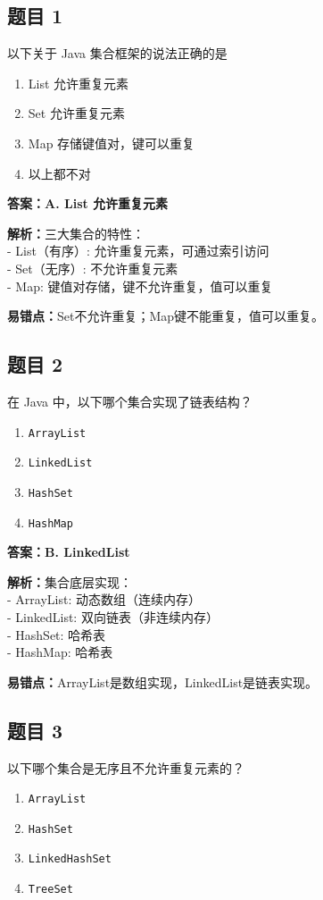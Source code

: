 \documentclass[12pt,a4paper]{ctexart}
\begin{document}
\subsection*{题目 1}
以下关于 Java 集合框架的说法正确的是
\begin{enumerate}[label=\Alph*.]
	\item List 允许重复元素
	\item Set 允许重复元素
	\item Map 存储键值对，键可以重复
	\item 以上都不对
\end{enumerate}

\begin{answerbox}
	\textbf{答案：A. List 允许重复元素}

	\textbf{解析：}三大集合的特性：\\
	- List（有序）: 允许重复元素，可通过索引访问\\
	- Set（无序）: 不允许重复元素\\
	- Map: 键值对存储，键不允许重复，值可以重复

	\textbf{易错点：}Set不允许重复；Map键不能重复，值可以重复。
\end{answerbox}

\subsection*{题目 2}
在 Java 中，以下哪个集合实现了链表结构？
\begin{enumerate}[label=\Alph*.]
	\item \texttt{ArrayList}
	\item \texttt{LinkedList}
	\item \texttt{HashSet}
	\item \texttt{HashMap}
\end{enumerate}

\begin{answerbox}
	\textbf{答案：B. LinkedList}

	\textbf{解析：}集合底层实现：\\
	- ArrayList: 动态数组（连续内存）\\
	- LinkedList: 双向链表（非连续内存）\\
	- HashSet: 哈希表\\
	- HashMap: 哈希表

	\textbf{易错点：}ArrayList是数组实现，LinkedList是链表实现。
\end{answerbox}

\subsection*{题目 3}
以下哪个集合是无序且不允许重复元素的？
\begin{enumerate}[label=\Alph*.]
	\item \texttt{ArrayList}
	\item \texttt{HashSet}
	\item \texttt{LinkedHashSet}
	\item \texttt{TreeSet}
\end{enumerate}
\end{document}
